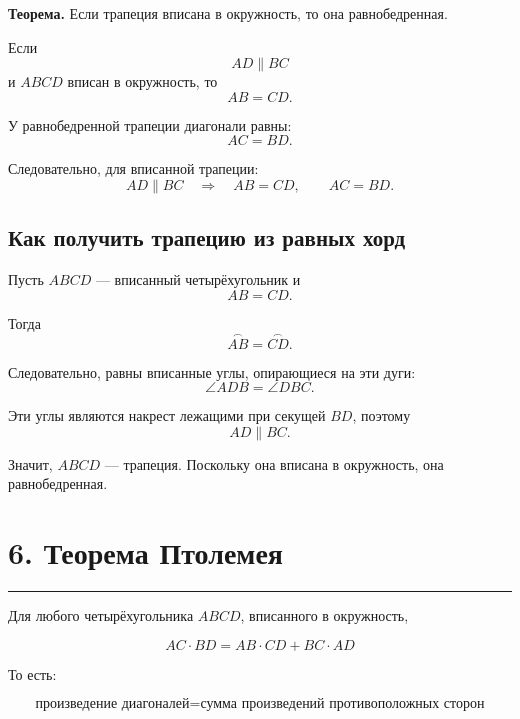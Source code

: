 \documentclass[a4paper,12pt]{article}
\newcommand{\sectionrule}{
  \par
  \vspace{0.2em}
  \noindent
  \textcolor{accent}{\rule{\linewidth}{0.7pt}}
  \vspace{0.35em}
}
\newcommand{\key}[1]{\textbf{\textcolor{darkaccent}{#1}}}
\newcommand{\formula}[1]{\[\boxed{#1}\]}
\begin{document}
\key{Теорема.}
Если трапеция вписана в окружность,
то она равнобедренная.

Если
\[
AD\parallel BC
\]
и \(ABCD\) вписан в окружность, то
\[
AB=CD.
\]

У равнобедренной трапеции диагонали равны:
\[
AC=BD.
\]

Следовательно, для вписанной трапеции:
\[
AD\parallel BC
\quad\Rightarrow\quad
AB=CD,
\qquad
AC=BD.
\]

\subsection*{Как получить трапецию из равных хорд}

Пусть \(ABCD\) --- вписанный четырёхугольник и
\[
AB=CD.
\]

Тогда
\[
\overset{\frown}{AB}
=
\overset{\frown}{CD}.
\]

Следовательно, равны вписанные углы,
опирающиеся на эти дуги:
\[
\angle ADB
=
\angle DBC.
\]

Эти углы являются накрест лежащими
при секущей \(BD\), поэтому
\[
AD\parallel BC.
\]

Значит, \(ABCD\) --- трапеция.
Поскольку она вписана в окружность,
она равнобедренная.

\section*{6. Теорема Птолемея}
\sectionrule

Для любого четырёхугольника \(ABCD\),
вписанного в окружность,

\formula{
AC\cdot BD
=
AB\cdot CD
+
BC\cdot AD
}

То есть:

\[
\boxed{
\text{произведение диагоналей}
=
\text{сумма произведений противоположных сторон}
}
\]

\begin{center}
\end{center}
\end{document}
